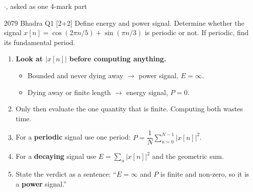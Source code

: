 \hr

{\color{sub}\footnotesize {} 
\gap$\cdot$\gap {}, asked as one 4-mark part}

\begin{asked}{2079 Bhadra \textperiodcentered{} Q1 \textperiodcentered{} [2+2]}
Define energy and power signal. Determine whether the signal
$x[n]=\cos(2\pi n/5)+\sin(\pi n/3)$ is periodic or not. If periodic, find its fundamental
period.
\end{asked}

\begin{enumerate}
  \item \textbf{Look at $|x[n]|$ before computing anything.}
  \begin{itemize}
    \item Bounded and never dying away $\rightarrow$ power signal, $E=\infty$.
    \item Dying away or finite length $\rightarrow$ energy signal, $P=0$.
  \end{itemize}
  \item Only then evaluate the one quantity that is finite. Computing both wastes time.
  \item For a \textbf{periodic} signal use one period:
        $P=\dfrac1N\displaystyle\sum_{n=0}^{N-1}|x[n]|^2$.
  \item For a \textbf{decaying} signal use $E=\displaystyle\sum_n|x[n]|^2$ and the
        geometric sum.
  \item State the verdict as a sentence: ``$E=\infty$ and $P$ is finite and non-zero, so it
        is a \textbf{power} signal.''
\end{enumerate}

